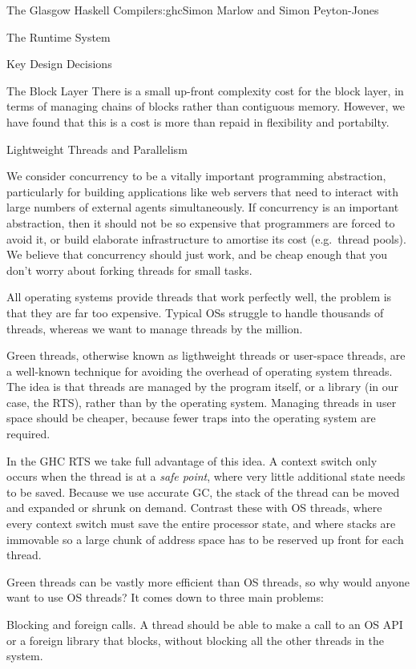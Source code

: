 \begin{aosachapter}{The Glasgow Haskell Compiler}{s:ghc}{Simon Marlow and Simon Peyton-Jones}
\begin{aosasect1}{The Runtime System}
\begin{aosasect2}{Key Design Decisions}
\begin{aosasect3}{The Block Layer}
There is a small up-front complexity cost for the block layer, in
terms of managing chains of blocks rather than contiguous memory.
However, we have found that this is a cost is more than repaid in
flexibility and portabilty.

\end{aosasect3}

\begin{aosasect3}{Lightweight Threads and Parallelism}

We consider concurrency to be a vitally important programming
abstraction, particularly for building applications like web servers
that need to interact with large numbers of external agents
simultaneously.  If concurrency is an important abstraction, then it
should not be so expensive that programmers are forced to avoid it, or
build elaborate infrastructure to amortise its cost (e.g.\ thread
pools).  We believe that concurrency should just work, and be cheap
enough that you don't worry about forking threads for small tasks.

All operating systems provide threads that work perfectly well, the
problem is that they are far too expensive.  Typical OSs struggle to
handle thousands of threads, whereas we want to manage threads by the
million.

Green threads, otherwise known as ligthweight threads or user-space
threads, are a well-known technique for avoiding the overhead of
operating system threads.  The idea is that threads are managed by the
program itself, or a library (in our case, the RTS), rather than by
the operating system.  Managing threads in user space should be
cheaper, because fewer traps into the operating system are required.

In the GHC RTS we take full advantage of this idea.  A context switch
only occurs when the thread is at a \emph{safe point}, where very
little additional state needs to be saved.  Because we use accurate
GC, the stack of the thread can be moved and expanded or shrunk on
demand.  Contrast these with OS threads, where every context switch
must save the entire processor state, and where stacks are immovable
so a large chunk of address space has to be reserved up front for each
thread.

Green threads can be vastly more efficient than OS threads, so why
would anyone want to use OS threads?  It comes down to three main
problems:

\begin{aosaitemize}

\item Blocking and foreign calls.  A thread should be able to make a
  call to an OS API or a foreign library that blocks, without blocking
  all the other threads in the system.


\end{aosaitemize}
\end{aosasect3}
\end{aosasect2}
\end{aosasect1}
\end{aosachapter}
